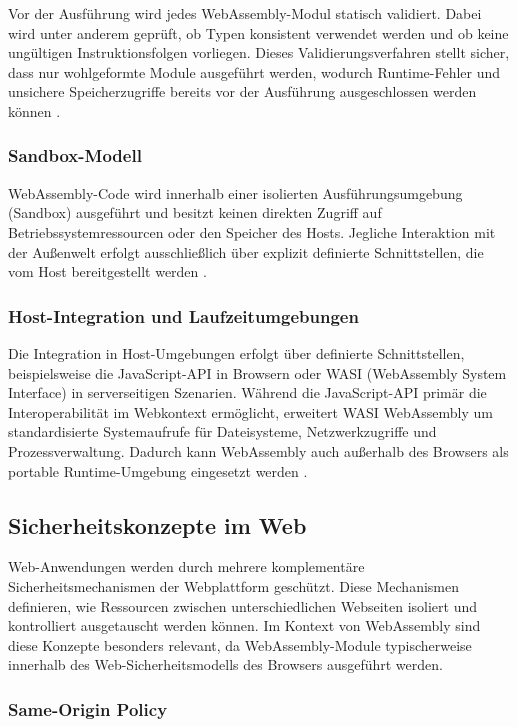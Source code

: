 Vor der Ausführung wird jedes WebAssembly-Modul statisch validiert. Dabei wird unter anderem geprüft, ob Typen konsistent verwendet werden und ob keine ungültigen Instruktionsfolgen vorliegen. Dieses Validierungsverfahren stellt sicher, dass nur wohlgeformte Module ausgeführt werden, wodurch Runtime-Fehler und unsichere Speicherzugriffe bereits vor der Ausführung ausgeschlossen werden können \cite{wasmcoreW3C}.

\subsubsection{Sandbox-Modell}

WebAssembly-Code wird innerhalb einer isolierten Ausführungsumgebung (Sandbox) ausgeführt und besitzt keinen direkten Zugriff auf Betriebssystemressourcen oder den Speicher des Hosts. Jegliche Interaktion mit der Außenwelt erfolgt ausschließlich über explizit definierte Schnittstellen, die vom Host bereitgestellt werden \cite{wasmcoreW3C}.

\subsubsection{Host-Integration und Laufzeitumgebungen}

Die Integration in Host-Umgebungen erfolgt über definierte Schnittstellen, beispielsweise die JavaScript-API in Browsern oder WASI (WebAssembly System Interface) in serverseitigen Szenarien. Während die JavaScript-API primär die Interoperabilität im Webkontext ermöglicht, erweitert WASI WebAssembly um standardisierte Systemaufrufe für Dateisysteme, Netzwerkzugriffe und Prozessverwaltung. Dadurch kann WebAssembly auch außerhalb des Browsers als portable Runtime-Umgebung eingesetzt werden \cite{wasmcoreW3C,bytecode_alliance}.

\subsection{Sicherheitskonzepte im Web}

Web-Anwendungen werden durch mehrere komplementäre Sicherheitsmechanismen der Webplattform geschützt. Diese Mechanismen definieren, wie Ressourcen zwischen unterschiedlichen Webseiten isoliert und kontrolliert ausgetauscht werden können. Im Kontext von WebAssembly sind diese Konzepte besonders relevant, da WebAssembly-Module typischerweise innerhalb des Web-Sicherheitsmodells des Browsers ausgeführt werden.

\subsubsection{Same-Origin Policy}

